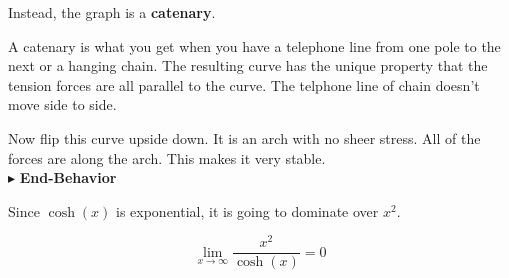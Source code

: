 \documentclass{ximera}
\begin{document}
Instead, the graph is a \textbf{catenary}.

A catenary is what you get when you have a telephone line from one pole to the next or a hanging chain.  The resulting curve has the unique property that the tension forces are all parallel to the curve. The telphone line of chain doesn't move side to side.

Now flip this curve upside down.  It is an arch with no sheer stress.  All of the forces are along the arch.  This makes it very stable. \\






$\blacktriangleright$ \textbf{End-Behavior}

Since $\cosh(x)$ is exponential, it is going to dominate over $x^2$.

\[     \lim_{x \to \infty}\frac{x^2}{\cosh(x)} = 0     \]
\end{document}
